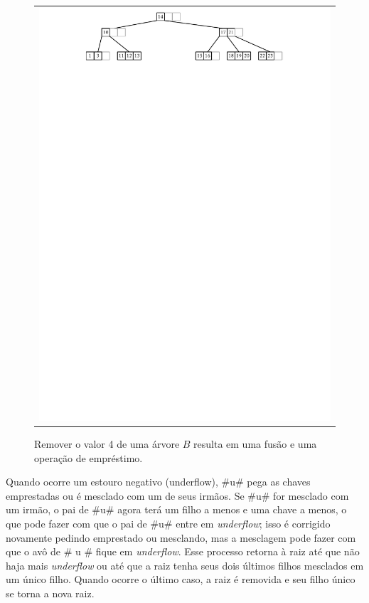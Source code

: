\begin{figure}
{\begin{tabular}{@{}l@{}}
     \includegraphics[width=\ScaleIfNeeded]{figs/btree-remove-full-4} \\[2ex]
   \end{tabular}}
   \caption[Removrndo de uma árvore $B$]{Remover o valor 4 de uma árvore $B$ resulta em uma fusão e uma operação de empréstimo.}
\end{figure}

Quando ocorre um estouro negativo (underflow), #u# pega as chaves emprestadas ou é mesclado com um de seus irmãos. Se #u# for mesclado com um irmão, o pai de #u# agora terá um filho a menos e uma chave a menos, o que pode fazer com que o pai de #u# entre em \emph{underflow}; isso é corrigido novamente pedindo emprestado ou mesclando, mas a mesclagem pode fazer com que o avô de # u # fique em \emph{underflow}. Esse processo retorna à raiz até que não haja mais \emph{underflow} ou até que a raiz tenha seus dois últimos filhos mesclados em um único filho.
Quando ocorre o último caso, a raiz é removida e seu filho único se torna a nova raiz.

